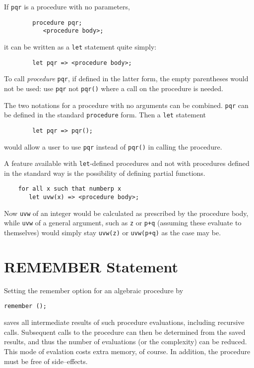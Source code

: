 If \texttt{pqr} is a procedure with no parameters,
\begin{verbatim}
        procedure pqr;
           <procedure body>;
\end{verbatim}
it can be written as a \texttt{let} statement quite simply:
\begin{verbatim}
        let pqr => <procedure body>;
\end{verbatim}
To call \emph{procedure} \texttt{pqr}, if defined in the latter form, the empty
parentheses would not be used: use \texttt{pqr} not \texttt{pqr()} where a call
on the procedure is needed.

The two notations for a procedure with no arguments can be combined. \texttt{pqr}
can be defined in the standard \texttt{procedure} form. Then a \texttt{let}
statement
\begin{verbatim}
        let pqr => pqr();
\end{verbatim}
would allow a user to use \texttt{pqr} instead of \texttt{pqr()} in calling the
procedure.

A feature available with \texttt{let}-defined procedures and not with procedures
defined in the standard way is the possibility of defining partial
functions.
\begin{verbatim}
    for all x such that numberp x
       let uvw(x) => <procedure body>;
\end{verbatim}
Now \texttt{uvw} of an integer would be calculated as prescribed by the procedure
body, while \texttt{uvw} of a general argument, such as \texttt{z} or \texttt{p+q}
(assuming these evaluate to themselves) would simply stay \texttt{uvw(z)}
or \texttt{uvw(p+q)} as the case may be.


\section{REMEMBER Statement}
\hypertarget{command:REMEMBER}{}

Setting the remember option for an algebraic procedure by
\begin{syntax}
     \texttt{remember (}\texttt{);}
\end{syntax}
saves all intermediate results of such procedure evaluations, including
recursive calls.  Subsequent calls to the procedure can then be determined
from the saved results, and thus the number of evaluations (or the
complexity) can be reduced.  This mode of evalation costs extra memory, of
course.  In addition, the procedure must be free of side--effects.

